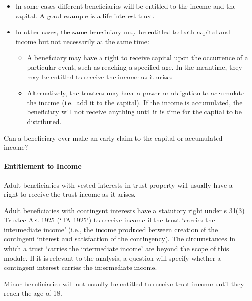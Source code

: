\documentclass[
]{article}
\providecommand{\tightlist}{%
  \setlength{\itemsep}{0pt}\setlength{\parskip}{0pt}}
\begin{document}
\begin{itemize}
\tightlist
\item
  In some cases different beneficiaries will be entitled to the income
  and the capital. A good example is a life interest trust.
\item
  In other cases, the same beneficiary may be entitled to both capital
  and income but not necessarily at the same time:

  \begin{itemize}
  \tightlist
  \item
    A beneficiary may have a right to receive capital upon the
    occurrence of a particular event, such as reaching a specified age.
    In the meantime, they may be entitled to receive the income as it
    arises.
  \item
    Alternatively, the trustees may have a power or obligation to
    accumulate the income (i.e.~add it to the capital). If the income is
    accumulated, the beneficiary will not receive anything until it is
    time for the capital to be distributed.
  \end{itemize}
\end{itemize}

Can a beneficiary ever make an early claim to the capital or accumulated
income?

\hypertarget{entitlement-to-income}{%
\paragraph{Entitlement to Income}\label{entitlement-to-income}}

Adult beneficiaries with vested interests in trust property will usually
have a right to receive the trust income as it arises.

Adult beneficiaries with contingent interests have a statutory right
under
\href{https://www.legislation.gov.uk/ukpga/Geo5/15-16/19/section/31}{s
31(3) Trustee Act 1925} (`TA 1925') to receive income if the trust
`carries the intermediate income' (i.e., the income produced between
creation of the contingent interest and satisfaction of the
contingency). The circumstances in which a trust `carries the
intermediate income' are beyond the scope of this module. If it is
relevant to the analysis, a question will specify whether a contingent
interest carries the intermediate income.

Minor beneficiaries will not usually be entitled to receive trust income
until they reach the age of 18.
\end{document}
